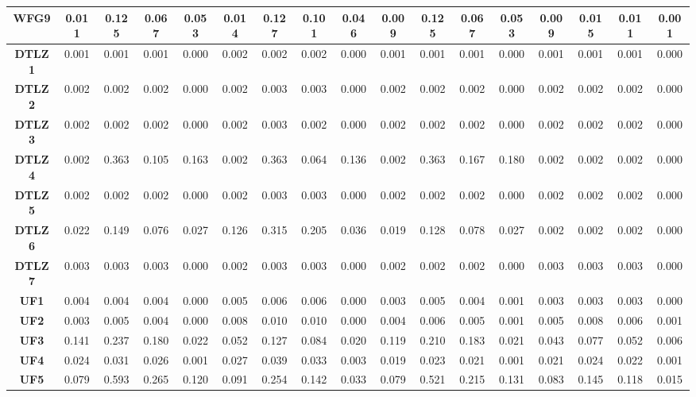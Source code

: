 \begin{table*}[t]
\begin{tabular}{c|c|c|c|c|c|c|c|c|c|c|c|c|c|c|c|c|}
\multicolumn{1}{|c|}{\textbf{WFG9}} & 0.011 & 0.125 & 0.067 & 0.053 & 0.014 & 0.127 & 0.101 & 0.046 & 0.009 & 0.125 & 0.067 & 0.053 & 0.009 & 0.015 & 0.011 & 0.001 \\ \hline
\multicolumn{1}{|c|}{\textbf{DTLZ1}} & 0.001 & 0.001 & 0.001 & 0.000 & 0.002 & 0.002 & 0.002 & 0.000 & 0.001 & 0.001 & 0.001 & 0.000 & 0.001 & 0.001 & 0.001 & 0.000 \\ \hline
\multicolumn{1}{|c|}{\textbf{DTLZ2}} & 0.002 & 0.002 & 0.002 & 0.000 & 0.002 & 0.003 & 0.003 & 0.000 & 0.002 & 0.002 & 0.002 & 0.000 & 0.002 & 0.002 & 0.002 & 0.000 \\ \hline
\multicolumn{1}{|c|}{\textbf{DTLZ3}} & 0.002 & 0.002 & 0.002 & 0.000 & 0.002 & 0.003 & 0.002 & 0.000 & 0.002 & 0.002 & 0.002 & 0.000 & 0.002 & 0.002 & 0.002 & 0.000 \\ \hline
\multicolumn{1}{|c|}{\textbf{DTLZ4}} & 0.002 & 0.363 & 0.105 & 0.163 & 0.002 & 0.363 & 0.064 & 0.136 & 0.002 & 0.363 & 0.167 & 0.180 & 0.002 & 0.002 & 0.002 & 0.000 \\ \hline
\multicolumn{1}{|c|}{\textbf{DTLZ5}} & 0.002 & 0.002 & 0.002 & 0.000 & 0.002 & 0.003 & 0.003 & 0.000 & 0.002 & 0.002 & 0.002 & 0.000 & 0.002 & 0.002 & 0.002 & 0.000 \\ \hline
\multicolumn{1}{|c|}{\textbf{DTLZ6}} & 0.022 & 0.149 & 0.076 & 0.027 & 0.126 & 0.315 & 0.205 & 0.036 & 0.019 & 0.128 & 0.078 & 0.027 & 0.002 & 0.002 & 0.002 & 0.000 \\ \hline
\multicolumn{1}{|c|}{\textbf{DTLZ7}} & 0.003 & 0.003 & 0.003 & 0.000 & 0.002 & 0.003 & 0.003 & 0.000 & 0.002 & 0.002 & 0.002 & 0.000 & 0.003 & 0.003 & 0.003 & 0.000 \\ \hline
\multicolumn{1}{|c|}{\textbf{UF1}} & 0.004 & 0.004 & 0.004 & 0.000 & 0.005 & 0.006 & 0.006 & 0.000 & 0.003 & 0.005 & 0.004 & 0.001 & 0.003 & 0.003 & 0.003 & 0.000 \\ \hline
\multicolumn{1}{|c|}{\textbf{UF2}} & 0.003 & 0.005 & 0.004 & 0.000 & 0.008 & 0.010 & 0.010 & 0.000 & 0.004 & 0.006 & 0.005 & 0.001 & 0.005 & 0.008 & 0.006 & 0.001 \\ \hline
\multicolumn{1}{|c|}{\textbf{UF3}} & 0.141 & 0.237 & 0.180 & 0.022 & 0.052 & 0.127 & 0.084 & 0.020 & 0.119 & 0.210 & 0.183 & 0.021 & 0.043 & 0.077 & 0.052 & 0.006 \\ \hline
\multicolumn{1}{|c|}{\textbf{UF4}} & 0.024 & 0.031 & 0.026 & 0.001 & 0.027 & 0.039 & 0.033 & 0.003 & 0.019 & 0.023 & 0.021 & 0.001 & 0.021 & 0.024 & 0.022 & 0.001 \\ \hline
\multicolumn{1}{|c|}{\textbf{UF5}} & 0.079 & 0.593 & 0.265 & 0.120 & 0.091 & 0.254 & 0.142 & 0.033 & 0.079 & 0.521 & 0.215 & 0.131 & 0.083 & 0.145 & 0.118 & 0.015 \\ \hline

\end{tabular}
\end{table*}
